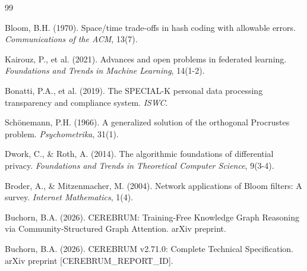 \documentclass[10pt,twocolumn]{article}
\begin{document}

\begin{thebibliography}{99}

Bloom, B.H. (1970).
Space/time trade-offs in hash coding with allowable errors.
\emph{Communications of the ACM}, 13(7).

Kairouz, P., et al. (2021).
Advances and open problems in federated learning.
\emph{Foundations and Trends in Machine Learning}, 14(1-2).

Bonatti, P.A., et al. (2019).
The SPECIAL-K personal data processing transparency and compliance system.
\emph{ISWC}.

Schönemann, P.H. (1966).
A generalized solution of the orthogonal Procrustes problem.
\emph{Psychometrika}, 31(1).

Dwork, C., \& Roth, A. (2014).
The algorithmic foundations of differential privacy.
\emph{Foundations and Trends in Theoretical Computer Science}, 9(3-4).

Broder, A., \& Mitzenmacher, M. (2004).
Network applications of Bloom filters: A survey.
\emph{Internet Mathematics}, 1(4).

Buchorn, B.A. (2026).
CEREBRUM: Training-Free Knowledge Graph Reasoning via Community-Structured Graph Attention.
arXiv preprint.

Buchorn, B.A. (2026).
CEREBRUM v2.71.0: Complete Technical Specification.
arXiv preprint [CEREBRUM\_REPORT\_ID].

\end{thebibliography}
\end{document}
